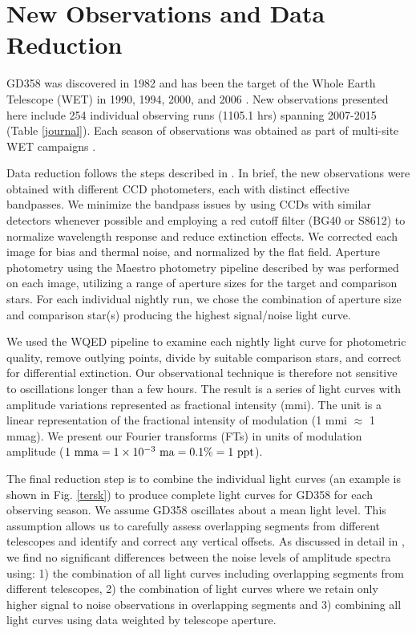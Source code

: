 \documentclass[12pt,preprint]{aastex}
\begin{document}
\section {New Observations and Data Reduction}\label{data}

GD358 was discovered in 1982 \citep{Winget82} and has been the target of the Whole 
Earth Telescope (WET) in 1990, 1994, 2000, and 2006 \citep{Provencal09, Kepler03,Winget94}. 
New observations presented here include 254 individual observing runs (1105.1 hrs) spanning 
2007-2015 (Table \ref{journal}). Each season of observations was obtained as part of 
multi-site WET campaigns \citep{wet90}. 

Data reduction follows the steps described in \citet{Provencal12}. In brief, the new observations 
were obtained with different CCD photometers, each with distinct effective bandpasses. 
We minimize the bandpass issues by using CCDs with similar detectors whenever possible and 
employing a red cutoff filter (BG40 or S8612) to normalize wavelength response and 
reduce extinction effects. We corrected each image for bias and thermal noise, and 
normalized by the flat field. Aperture photometry using the Maestro photometry pipeline 
described by \citet{Dalessio10} was performed on each image, utilizing a range of 
aperture sizes for the target and comparison stars. For each individual nightly run, we 
chose the combination of aperture size and comparison star(s) producing the highest 
signal/noise light curve. 

We used the WQED pipeline \citep{wqed} to examine each nightly light curve for photometric 
quality, remove outlying points, divide by suitable comparison stars, and correct for 
differential extinction. Our observational technique is therefore not sensitive to 
oscillations longer than a few hours. The result is a series of light curves 
with amplitude variations represented as fractional intensity (mmi). The unit is a linear 
representation of the fractional intensity of modulation (1 mmi $\approx$ 1 mmag). We present
our Fourier transforms (FTs) in units of modulation amplitude 
($1\ {\rm mma}=1 \times 10^{-3}\ {\rm ma} = 0.1 \% = 1\ {\rm ppt}$).

The final reduction step is to combine the individual light curves 
(an example is shown in Fig. \ref{tersk}) to produce complete light curves for GD358 for each 
observing season. We assume GD358 oscillates about a mean light level. This assumption 
allows us to carefully assess overlapping segments from different telescopes and identify 
and correct any vertical offsets. As discussed in detail in \citet{Provencal09}, we find 
no significant differences between the noise levels of amplitude spectra using: 
1) the combination of all light curves including overlapping 
segments from different telescopes, 2) the combination of light curves where we retain 
only higher signal to noise observations in overlapping segments and 3) combining all light 
curves using data weighted by telescope aperture.
\end{document}
